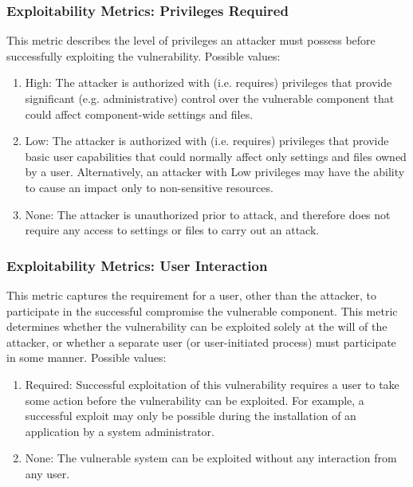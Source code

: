 \documentclass[a4paper, 10pt, titlepage]{article}
\begin{document}
\subsubsection*{Exploitability Metrics: Privileges Required}
This metric describes the level of privileges an attacker must possess before successfully exploiting the vulnerability. Possible values:
\begin{enumerate}
	\item High: The attacker is authorized with (i.e. requires) privileges that provide significant (e.g. administrative) control over the vulnerable component that could affect component-wide settings and files.
	\item Low: The attacker is authorized with (i.e. requires) privileges that provide basic user capabilities that could normally affect only settings and files owned by a user. Alternatively, an attacker with Low privileges may have the ability to cause an impact only to non-sensitive resources.
	\item None: The attacker is unauthorized prior to attack, and therefore does not require any access to settings or files to carry out an attack.
\end{enumerate}

\subsubsection*{Exploitability Metrics: User Interaction}
This metric captures the requirement for a user, other than the attacker, to participate in the successful compromise the vulnerable component. This metric determines whether the vulnerability can be exploited solely at the will of the attacker, or whether a separate user (or user-initiated process) must participate in some manner. Possible values:
\begin{enumerate}
	\item Required: Successful exploitation of this vulnerability requires a user to take some action before the vulnerability can be exploited. For example, a successful 	exploit may only be possible during the installation of an application by a system administrator.
	\item None: The vulnerable system can be exploited without any interaction from any user.	
\end{enumerate}
\end{document}

